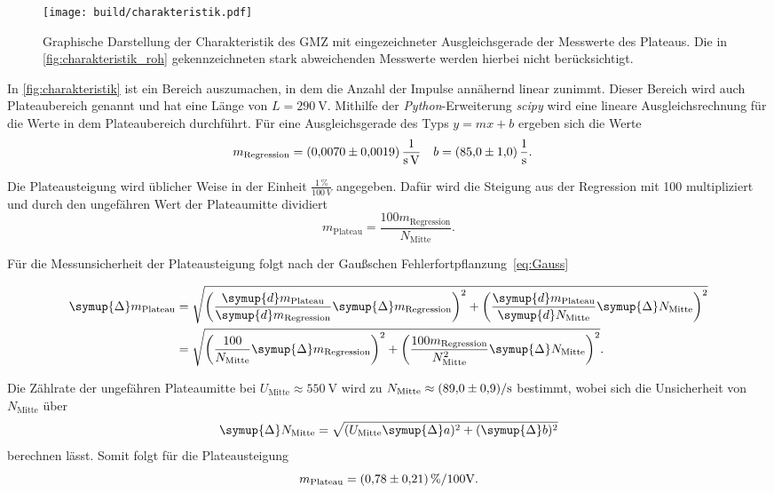 \begin{figure}[H]
    \centering
    \texttt{[image: build/charakteristik.pdf]}
    \caption{Graphische Darstellung der Charakteristik des GMZ mit eingezeichneter Ausgleichsgerade der %
    Messwerte des Plateaus. Die in \autoref{fig:charakteristik_roh} gekennzeichneten stark abweichenden %
    Messwerte werden hierbei nicht berücksichtigt.}
    \label{fig:charakteristik}
\end{figure}

In \autoref{fig:charakteristik} ist ein Bereich auszumachen, in dem die Anzahl der Impulse annähernd linear
zunimmt. Dieser Bereich wird auch Plateaubereich genannt und hat eine Länge von $L=\qty{290}{\volt}$. Mithilfe der \textit{Python}-Erweiterung \textit{scipy} \cite{scipy} wird eine lineare Ausgleichsrechnung
für die Werte in dem Plateaubereich durchführt. Für eine Ausgleichsgerade des Typs $y=mx + b$ ergeben sich die
Werte
\begin{align*}
    m_{\text{Regression}} &= \qty{0.0070+-0.0019}{\per\second\per\volt} & b &= \qty{85.0+-1.0}{\per\second}.
\end{align*}

Die Plateausteigung wird üblicher Weise in der Einheit $\frac{1\,\%}{100\,V}$ angegeben. Dafür wird die Steigung aus der Regression mit 100 multipliziert 
und durch den ungefähren Wert der Plateaumitte dividiert
\begin{equation*}
    m_{\text{Plateau}} = \frac{100 m_{\text{Regression}}}{N_{\text{Mitte}}}.
\end{equation*}

Für die Messunsicherheit der Plateausteigung folgt nach der Gaußschen Fehlerfortpflanzung~\eqref{eq:Gauss}

\begin{align*}
    \symup{\Delta}m_{\text{Plateau}} &= \sqrt{\left(\frac{\symup{d}m_{\text{Plateau}}}{\symup{d}m_{\text{Regression}}}\symup{\Delta} m_{\text{Regression}} \right)^2 + %
     \left(\frac{\symup{d}m_{\text{Plateau}}}{\symup{d}N_{\text{Mitte}}}\symup{\Delta} N_{\text{Mitte}} \right)^2} \\
     &=\sqrt{\left(\frac{100}{N_{\text{Mitte}}}\symup{\Delta} m_{\text{Regression}}\right)^2 + \left(\frac{100 m_{\text{Regression}}}{N_{\text{Mitte}}^2}\symup{\Delta} N_{\text{Mitte}}\right)^2}.
\end{align*}

Die Zählrate der ungefähren Plateaumitte bei $U_{\text{Mitte}}\approx \qty{550}{\volt}$ wird zu $N_{\text{Mitte}} \approx \qty{89+-0.9}{\per\second}$
bestimmt, wobei sich die Unsicherheit von $N_{\text{Mitte}}$ über 
\begin{equation*}
    \symup{\Delta}N_{\text{Mitte}} = \sqrt{(U_{\text{Mitte}}\symup{\Delta}a)^2 + (\symup{\Delta}b)^2}
\end{equation*} 
berechnen lässt. Somit folgt für die Plateausteigung
\begin{equation*}
    m_{\text{Plateau}} = \qty{0.78+-0.21}{\percent\per100\volt}.
\end{equation*}

